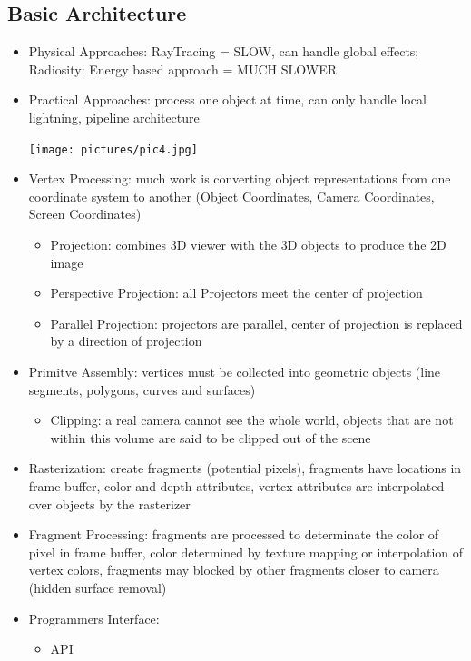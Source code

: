 \documentclass[11pt,a4paper]{article}
\begin{document}
	\subsection{Basic Architecture} 
		\begin{itemize}
			\item Physical Approaches: RayTracing = SLOW, can handle global effects; Radiosity: Energy based approach = MUCH SLOWER
			\item Practical Approaches: process one object at time, can only handle local lightning, pipeline architecture
			\begin{center}
				\texttt{[image: pictures/pic4.jpg]}
			\end{center}
			\item Vertex Processing: much work is converting object representations from one coordinate system to another (Object Coordinates, Camera Coordinates, Screen Coordinates)
			\begin{itemize}
				\item Projection: combines 3D viewer with the 3D objects to produce the 2D image
				\item Perspective Projection: all Projectors meet the center of projection
				\item Parallel Projection: projectors are parallel, center of projection is replaced by a direction of projection
			\end{itemize}
			\item Primitve Assembly: vertices must be collected into geometric objects (line segments, polygons, curves and surfaces)
			\begin{itemize}
				\item Clipping: a real camera cannot see the whole world, objects that are not within this volume are said to be clipped out of the scene
			\end{itemize}
			\item Rasterization: create fragments (potential pixels), fragments have locations in frame buffer, color and depth attributes, vertex attributes are interpolated over objects by the rasterizer
			\item Fragment Processing: fragments are processed to determinate the color of pixel in frame buffer, color determined by texture mapping or interpolation of vertex colors, fragments may blocked by other fragments closer to camera (hidden surface removal)
			\item Programmers Interface:
			\begin{itemize}
				\item API

\end{itemize}
\end{itemize}
\end{document}
